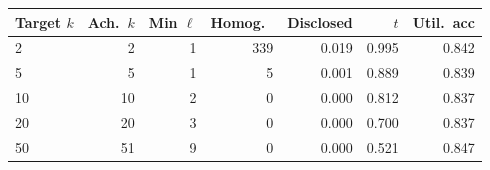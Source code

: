 \begin{tabular}{lrrrrrr}
\toprule
Target $k$ & Ach.\ $k$ & Min $\ell$ & Homog.\ & Disclosed & $t$ & Util.\ acc \\
\midrule
2 & 2 & 1 & 339 & 0.019 & 0.995 & 0.842 \\
5 & 5 & 1 & 5 & 0.001 & 0.889 & 0.839 \\
10 & 10 & 2 & 0 & 0.000 & 0.812 & 0.837 \\
20 & 20 & 3 & 0 & 0.000 & 0.700 & 0.837 \\
50 & 51 & 9 & 0 & 0.000 & 0.521 & 0.847 \\
\bottomrule
\end{tabular}
